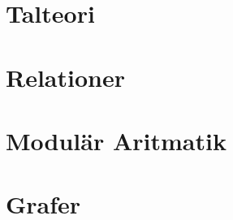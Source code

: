 \documentclass{article}
\begin{document}
	\section{Talteori}

	\section{Relationer}

	\section{Modulär Aritmatik}

	\section{Grafer}
\end{document}
